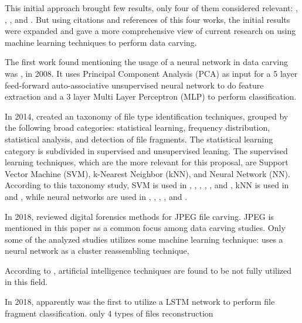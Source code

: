 This initial approach brought few results, only four of them considered relevant: \cite{alamri_taxonomy_2014}, 
\cite{ali_review_2018}, \cite{sportiello_context-based_2012}, and \cite{beebe_sceadan:_2013}. But using citations and references of this four works, the initial results were expanded and gave a more comprehensive view of current research on using machine learning techniques to perform data carving.

The first work found mentioning the usage of a neural network in data carving was \cite{amirani_new_2008}, in 2008. It uses Principal Component Analysis (PCA) as input for a 5 layer feed-forward auto-associative unsupervised neural network to do feature extraction and a 3 layer Multi Layer Perceptron (MLP) to perform classification.

In 2014, \cite{alamri_taxonomy_2014} created an taxonomy of file type identification techniques, grouped by the following broad categories: statistical learning, frequency distribution, statistical analysis, and detection of file fragments. The statistical learning category is subdivided in supervised and unsupervised leaning. The supervised learning techniques, which are the more relevant for this proposal, are Support Vector Machine (SVM), k-Nearest Neighbor (kNN), and Neural Network (NN). According to this taxonomy study, SVM is used in \cite{ahmed_fast_2011}, \cite{amirani_feature-based_2013}, \cite{beebe_sceadan:_2013}, \cite{fitzgerald_using_2012}, \cite{gopal_statistical_2011}, and \cite{sportiello_context-based_2012}, kNN is used in \cite{ahmed_fast_2011} and \cite{gopal_statistical_2011}, while neural networks are used in \cite{ahmed_fast_2011}, \cite{ahmed_content-based_2010}, \cite{amirani_new_2008}, \cite{amirani_feature-based_2013}, and \cite{penrose_approaches_2013}.

In 2018, \cite{ali_review_2018} reviewed digital forensics methods for JPEG file carving. JPEG is mentioned in this paper as a common focus among data carving studies. Only some of the analyzed studies utilizes some machine learning technique: \cite{xu_reassembling_2009} uses a neural network as a cluster reassembling technique, 


According to \cite{ali_review_2018}, artificial intelligence techniques are found to be not fully utilized in this field.

In 2018, \cite{hiester_file_2018} apparently was the first to utilize a LSTM network to perform file fragment classification.
only 4 types of files
reconstruction

